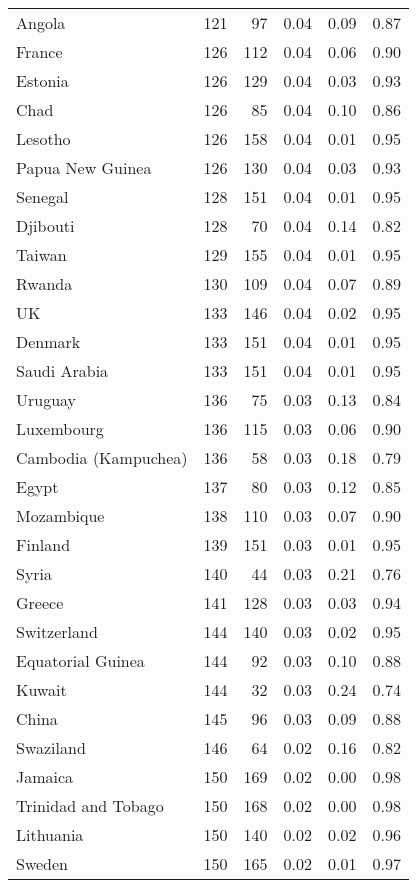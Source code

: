 \begin{longtable}[t]{lrrrrr}
\addlinespace
Angola & 121 & 97 & 0.04 & 0.09 & 0.87\\
France & 126 & 112 & 0.04 & 0.06 & 0.90\\
Estonia & 126 & 129 & 0.04 & 0.03 & 0.93\\
Chad & 126 & 85 & 0.04 & 0.10 & 0.86\\
Lesotho & 126 & 158 & 0.04 & 0.01 & 0.95\\
\addlinespace
Papua New Guinea & 126 & 130 & 0.04 & 0.03 & 0.93\\
Senegal & 128 & 151 & 0.04 & 0.01 & 0.95\\
Djibouti & 128 & 70 & 0.04 & 0.14 & 0.82\\
Taiwan & 129 & 155 & 0.04 & 0.01 & 0.95\\
Rwanda & 130 & 109 & 0.04 & 0.07 & 0.89\\
\addlinespace
UK & 133 & 146 & 0.04 & 0.02 & 0.95\\
Denmark & 133 & 151 & 0.04 & 0.01 & 0.95\\
Saudi Arabia & 133 & 151 & 0.04 & 0.01 & 0.95\\
Uruguay & 136 & 75 & 0.03 & 0.13 & 0.84\\
Luxembourg & 136 & 115 & 0.03 & 0.06 & 0.90\\
\addlinespace
Cambodia (Kampuchea) & 136 & 58 & 0.03 & 0.18 & 0.79\\
Egypt & 137 & 80 & 0.03 & 0.12 & 0.85\\
Mozambique & 138 & 110 & 0.03 & 0.07 & 0.90\\
Finland & 139 & 151 & 0.03 & 0.01 & 0.95\\
Syria & 140 & 44 & 0.03 & 0.21 & 0.76\\
\addlinespace
Greece & 141 & 128 & 0.03 & 0.03 & 0.94\\
Switzerland & 144 & 140 & 0.03 & 0.02 & 0.95\\
Equatorial Guinea & 144 & 92 & 0.03 & 0.10 & 0.88\\
Kuwait & 144 & 32 & 0.03 & 0.24 & 0.74\\
China & 145 & 96 & 0.03 & 0.09 & 0.88\\
\addlinespace
Swaziland & 146 & 64 & 0.02 & 0.16 & 0.82\\
Jamaica & 150 & 169 & 0.02 & 0.00 & 0.98\\
Trinidad and Tobago & 150 & 168 & 0.02 & 0.00 & 0.98\\
Lithuania & 150 & 140 & 0.02 & 0.02 & 0.96\\
Sweden & 150 & 165 & 0.02 & 0.01 & 0.97\\

\end{longtable}
